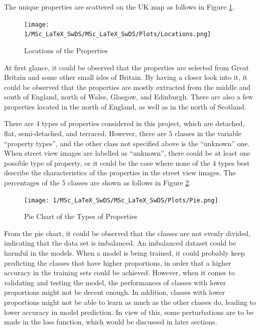 \documentclass[11pt,twoside]{article}
\numberwithin{Theorem}{section}
\numberwithin{Definition}{section}
\numberwithin{Lemma}{section}
\numberwithin{Algorithm}{section}
\numberwithin{equation}{section}
\begin{document}
The unique properties are scattered on the UK map as follows in Figure \ref{fig:locations}. 


\begin{figure}[h]
\centering
\texttt{[image: 1/MSc\_LaTeX\_SwDS/MSc\_LaTeX\_SwDS/Plots/Locations.png]}
\caption{Locations of the Properties}
\label{fig:locations}
\end{figure}

At first glance, it could be observed that the properties are selected from Great Britain and some other small isles of Britain. By having a closer look into it, it could be observed that the properties are mostly extracted from the middle and south of England, north of Wales, Glasgow, and Edinburgh. There are also a few properties located in the north of England, as well as in the north of Scotland.

There are $4$ types of properties considered in this project, which are detached, flat, semi-detached, and terraced. However, there are $5$ classes in the variable “property types”, and the other class not specified above is the “unknown” one. When street view images are labelled as “unknown”, there could be at least one possible type of property, or it could be the case where none of the $4$ types best describe the characteristics of the properties in the street view images. The percentages of the $5$ classes are shown as follows in Figure \ref{fig:pie}. 

\begin{figure}[h]
\centering
\texttt{[image: 1/MSc\_LaTeX\_SwDS/MSc\_LaTeX\_SwDS/Plots/Pie.png]}
\caption{Pie Chart of the Types of Properties}
\label{fig:pie}
\end{figure}

From the pie chart, it could be observed that the classes are not evenly divided, indicating that the data set is imbalanced. An imbalanced dataset could be harmful in the models. When a model is being trained, it could probably keep predicting the classes that have higher proportions, in order that a higher accuracy in the training sets could be achieved. However, when it comes to validating and testing the model, the performances of classes with lower proportions might not be decent enough. In addition, classes with lower proportions might not be able to learn as much as the other classes do, leading to lower accuracy in model prediction. In view of this, some perturbations are to be made in the loss function, which would be discussed in later sections.
\end{document}
